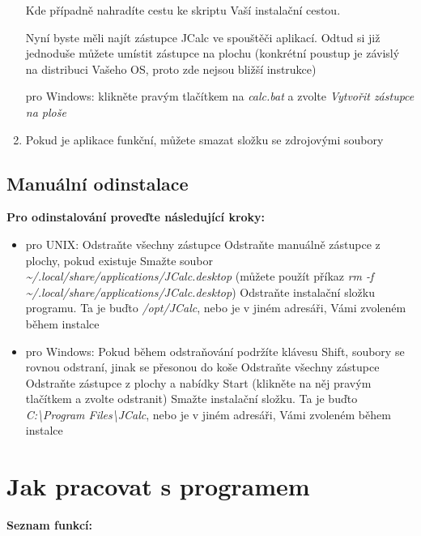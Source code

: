 \documentclass[a4paper, 11pt]{article}
\begin{document}
\begin{enumerate}
			\subsubitem Kde případně nahradíte cestu ke skriptu Vaší instalační cestou.

			\subsubitem Nyní byste měli najít zástupce JCalc ve spouštěči aplikací. Odtud si již jednoduše můžete umístit zástupce na plochu (konkrétní poustup je závislý na distribuci Vašeho OS, proto zde nejsou bližší instrukce)

		\subitem pro Windows:
			\subsubitem klikněte pravým tlačítkem na \emph{calc.bat} a zvolte \emph{Vytvořit zástupce na ploše}


	\item Pokud je aplikace funkční, můžete smazat složku se zdrojovými soubory
\end{enumerate}

\subsection{Manuální odinstalace}

\textbf{Pro odinstalování proveďte následující kroky:}

\begin{itemize}
	\item pro UNIX:
		\subitem Odstraňte všechny zástupce
			\subsubitem Odstraňte manuálně zástupce z plochy, pokud existuje
			\subsubitem Smažte soubor \emph{\textasciitilde/.local/share/applications/JCalc.desktop}
			\subsubitem (můžete použít příkaz \emph{rm -f \textasciitilde/.local/share/applications/JCalc.desktop})
		\subitem Odstraňte instalační složku programu. Ta je buďto \emph{/opt/JCalc}, nebo je v jiném adresáři, Vámi zvoleném během instalce

	\item pro Windows:
		\subitem Pokud během odstraňování podržíte klávesu Shift, soubory se rovnou odstraní, jinak se přesonou do koše
		\subitem Odstraňte všechny zástupce
			\subsubitem Odstraňte zástupce z plochy a nabídky Start (klikněte na něj pravým tlačítkem a zvolte odstranit)
		\subitem Smažte instalační složku. Ta je buďto \emph{C:\textbackslash Program Files\textbackslash JCalc}, nebo je v jiném adresáři, Vámi zvoleném během instalce
\end{itemize}

\section{Jak pracovat s programem}

\textbf{Seznam funkcí:}
\end{document}
